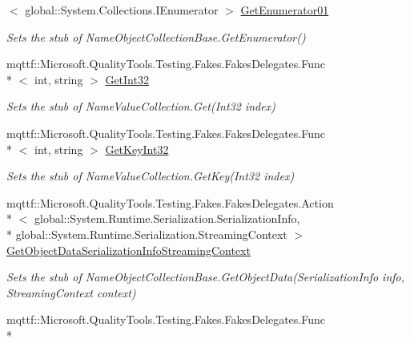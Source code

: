 \begin{DoxyCompactItemize}
$<$ global\-::\-System.\-Collections.\-I\-Enumerator $>$ \hyperlink{class_system_1_1_collections_1_1_specialized_1_1_fakes_1_1_stub_name_value_collection_a6283e78913507fe384d228395ac4103e}{Get\-Enumerator01}
\begin{DoxyCompactList}\small\item\em Sets the stub of Name\-Object\-Collection\-Base.\-Get\-Enumerator()\end{DoxyCompactList}\item 
mqttf\-::\-Microsoft.\-Quality\-Tools.\-Testing.\-Fakes.\-Fakes\-Delegates.\-Func\\*
$<$ int, string $>$ \hyperlink{class_system_1_1_collections_1_1_specialized_1_1_fakes_1_1_stub_name_value_collection_ab75223c0b01ad67d3f89377209e4b978}{Get\-Int32}
\begin{DoxyCompactList}\small\item\em Sets the stub of Name\-Value\-Collection.\-Get(\-Int32 index)\end{DoxyCompactList}\item 
mqttf\-::\-Microsoft.\-Quality\-Tools.\-Testing.\-Fakes.\-Fakes\-Delegates.\-Func\\*
$<$ int, string $>$ \hyperlink{class_system_1_1_collections_1_1_specialized_1_1_fakes_1_1_stub_name_value_collection_a8a5f258ee22197d723b183c8cf2010f3}{Get\-Key\-Int32}
\begin{DoxyCompactList}\small\item\em Sets the stub of Name\-Value\-Collection.\-Get\-Key(\-Int32 index)\end{DoxyCompactList}\item 
mqttf\-::\-Microsoft.\-Quality\-Tools.\-Testing.\-Fakes.\-Fakes\-Delegates.\-Action\\*
$<$ global\-::\-System.\-Runtime.\-Serialization.\-Serialization\-Info, \\*
global\-::\-System.\-Runtime.\-Serialization.\-Streaming\-Context $>$ \hyperlink{class_system_1_1_collections_1_1_specialized_1_1_fakes_1_1_stub_name_value_collection_ab18deba6e61e5a4ee11f66c96ebb7797}{Get\-Object\-Data\-Serialization\-Info\-Streaming\-Context}
\begin{DoxyCompactList}\small\item\em Sets the stub of Name\-Object\-Collection\-Base.\-Get\-Object\-Data(\-Serialization\-Info info, Streaming\-Context context)\end{DoxyCompactList}\item 
mqttf\-::\-Microsoft.\-Quality\-Tools.\-Testing.\-Fakes.\-Fakes\-Delegates.\-Func\\*

\end{DoxyCompactItemize}
